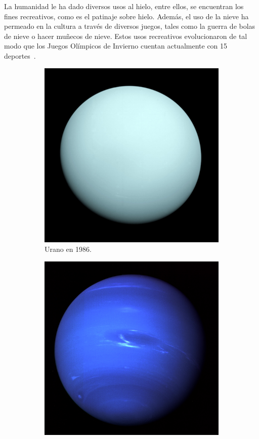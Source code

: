 La humanidad le ha dado diversos usos al hielo, entre ellos, se encuentran los
fines recreativos, como es el patinaje sobre hielo. Además, el uso de la nieve
ha permeado en la cultura a través de diversos juegos, tales como la guerra de
bolas de nieve o hacer muñecos de nieve. Estos usos recreativos evolucionaron
de tal modo que los Juegos Olímpicos de Invierno cuentan actualmente con 15
deportes~\cite{OInvierno}.

\begin{figure}%
\centering
\begin{subfigure}[b]{0.27\linewidth}
\includegraphics[width=\linewidth]{2/img/imagecuranusvoyager}
\caption{Urano en 1986.}
\label{urano}
\end{subfigure}
\begin{subfigure}[b]{0.27\linewidth}
\includegraphics[width=\linewidth]{2/img/imagedneptunevoyager}

\end{subfigure}
\end{figure}
